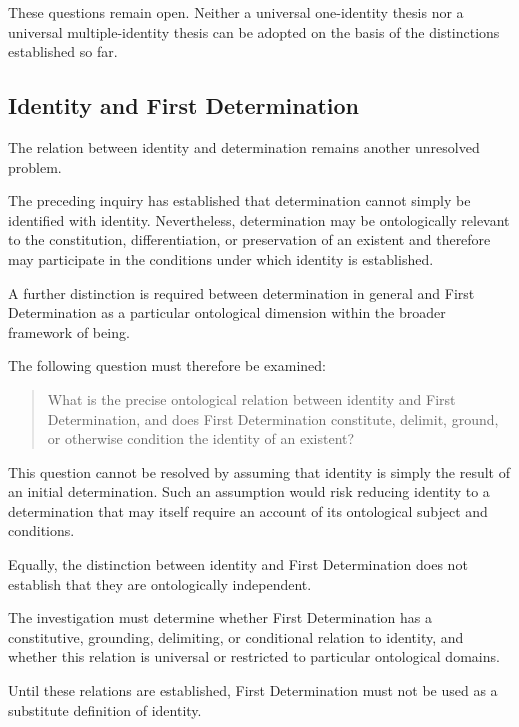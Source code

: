 These questions remain open. Neither a universal
one-identity thesis nor a universal multiple-identity
thesis can be adopted on the basis of the distinctions
established so far.


\subsection{Identity and First Determination}

The relation between identity and determination remains
another unresolved problem.

The preceding inquiry has established that determination
cannot simply be identified with identity. Nevertheless,
determination may be ontologically relevant to the
constitution, differentiation, or preservation of an
existent and therefore may participate in the conditions
under which identity is established.

A further distinction is required between determination
in general and First Determination as a particular
ontological dimension within the broader framework of
being.

The following question must therefore be examined:

\begin{quote}
What is the precise ontological relation between identity
and First Determination, and does First Determination
constitute, delimit, ground, or otherwise condition
the identity of an existent?
\end{quote}

This question cannot be resolved by assuming that
identity is simply the result of an initial determination.
Such an assumption would risk reducing identity to a
determination that may itself require an account of
its ontological subject and conditions.

Equally, the distinction between identity and First
Determination does not establish that they are
ontologically independent.

The investigation must determine whether First
Determination has a constitutive, grounding, delimiting,
or conditional relation to identity, and whether this
relation is universal or restricted to particular
ontological domains.

Until these relations are established, First
Determination must not be used as a substitute definition
of identity.

